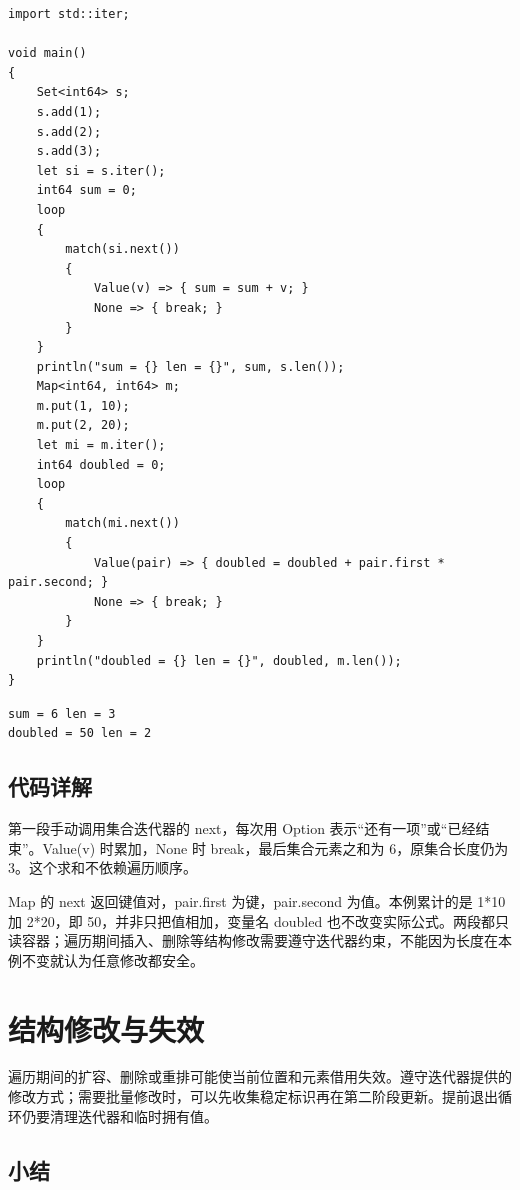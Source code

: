 \par
\medskip
\begin{lstlisting}[style=chali]
import std::iter;

void main()
{
    Set<int64> s;
    s.add(1);
    s.add(2);
    s.add(3);
    let si = s.iter();
    int64 sum = 0;
    loop
    {
        match(si.next())
        {
            Value(v) => { sum = sum + v; }
            None => { break; }
        }
    }
    println("sum = {} len = {}", sum, s.len());
    Map<int64, int64> m;
    m.put(1, 10);
    m.put(2, 20);
    let mi = m.iter();
    int64 doubled = 0;
    loop
    {
        match(mi.next())
        {
            Value(pair) => { doubled = doubled + pair.first * pair.second; }
            None => { break; }
        }
    }
    println("doubled = {} len = {}", doubled, m.len());
}
\end{lstlisting}
\par
\medskip

\par
\medskip
\begin{lstlisting}[style=out]
sum = 6 len = 3
doubled = 50 len = 2
\end{lstlisting}
\par
\medskip

\subsection*{代码详解}

第一段手动调用集合迭代器的 next，每次用 Option 表示“还有一项”或“已经结束”。Value(v) 时累加，None 时 break，最后集合元素之和为 6，原集合长度仍为 3。这个求和不依赖遍历顺序。

Map 的 next 返回键值对，pair.first 为键，pair.second 为值。本例累计的是 1*10 加 2*20，即 50，并非只把值相加，变量名 doubled 也不改变实际公式。两段都只读容器；遍历期间插入、删除等结构修改需要遵守迭代器约束，不能因为长度在本例不变就认为任意修改都安全。

\section{结构修改与失效}

遍历期间的扩容、删除或重排可能使当前位置和元素借用失效。遵守迭代器提供的修改方式；需要批量修改时，可以先收集稳定标识再在第二阶段更新。提前退出循环仍要清理迭代器和临时拥有值。

\subsection*{小结}

